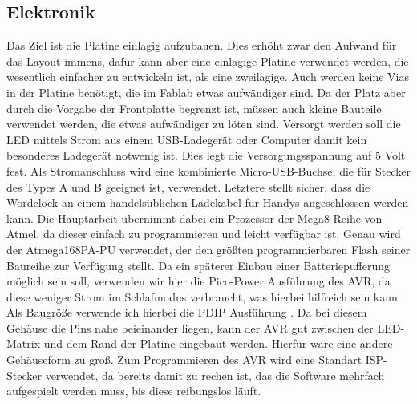 \documentclass[12pt,journal,compsoc]{IEEEtran}
\begin{document}
\subsection{Elektronik}
Das Ziel ist die Platine einlagig aufzubauen. Dies erhöht zwar den Aufwand für das Layout immens, dafür kann aber eine einlagige Platine verwendet werden, die wesentlich einfacher zu entwickeln ist, als eine zweilagige. Auch werden keine Vias in der Platine benötigt, die im Fablab etwas aufwändiger sind. Da der Platz aber durch die Vorgabe der Frontplatte begrenzt ist, müssen auch kleine Bauteile verwendet werden, die etwas aufwändiger zu löten sind.
Versorgt werden soll die LED mittels Strom aus einem USB-Ladegerät oder Computer damit kein besonderes Ladegerät notwenig ist. Dies legt die Versorgungsspannung auf 5 Volt fest. Als Stromanschluss wird eine kombinierte Micro-USB-Buchse, die für Stecker des Types A und B geeignet ist, verwendet. Letztere stellt sicher, dass  die Wordclock an einem handelsüblichen Ladekabel für Handys angeschlossen werden kann.
 Die Hauptarbeit übernimmt dabei ein Prozessor der  Mega8-Reihe von Atmel, da dieser einfach zu programmieren und leicht verfügbar ist. Genau wird der Atmega168PA-PU verwendet, der den größten programmierbaren Flash seiner Baureihe zur Verfügung stellt. Da ein späterer Einbau einer Batteriepufferung möglich sein soll, verwenden wir hier die Pico-Power Ausführung des AVR, da diese weniger Strom im Schlafmodus verbraucht, was hierbei hilfreich sein kann. Als Baugröße verwende ich hierbei die PDIP  Ausführung . Da bei diesem Gehäuse die Pins nahe beieinander liegen, kann der AVR gut zwischen der LED-Matrix und dem Rand der Platine eingebaut werden. Hierfür wäre eine andere Gehäuseform zu groß. Zum Programmieren des AVR wird eine Standart ISP-Stecker verwendet, da bereits damit zu rechen ist, das die Software mehrfach aufgespielt werden muss, bis diese reibungslos läuft. 
\end{document}
